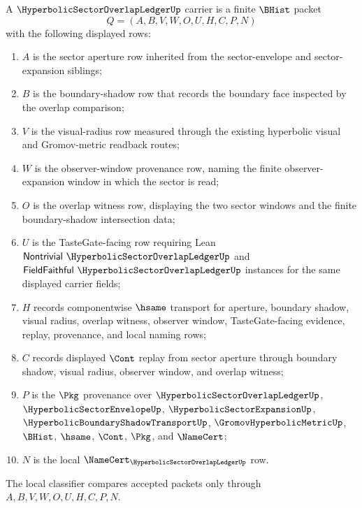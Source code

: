 \begin{definition}
\label{def:hyperbolic-sector-overlap-ledger-carrier}
A $\HyperbolicSectorOverlapLedgerUp$ carrier is a finite $\BHist$ packet
$$
Q=(A,B,V,W,O,U,H,C,P,N)
$$
with the following displayed rows:
\begin{enumerate}
\item $A$ is the sector aperture row inherited from the sector-envelope and sector-expansion siblings;
\item $B$ is the boundary-shadow row that records the boundary face inspected by the overlap comparison;
\item $V$ is the visual-radius row measured through the existing hyperbolic visual and Gromov-metric readback routes;
\item $W$ is the observer-window provenance row, naming the finite observer-expansion window in which the sector is read;
\item $O$ is the overlap witness row, displaying the two sector windows and the finite boundary-shadow intersection data;
\item $U$ is the TasteGate-facing row requiring Lean $\mathsf{Nontrivial}\ \HyperbolicSectorOverlapLedgerUp$ and $\mathsf{FieldFaithful}\ \HyperbolicSectorOverlapLedgerUp$ instances for the same displayed carrier fields;
\item $H$ records componentwise $\hsame$ transport for aperture, boundary shadow, visual radius, overlap witness, observer window, TasteGate-facing evidence, replay, provenance, and local naming rows;
\item $C$ records displayed $\Cont$ replay from sector aperture through boundary shadow, visual radius, observer window, and overlap witness;
\item $P$ is the $\Pkg$ provenance over $\HyperbolicSectorOverlapLedgerUp$, $\HyperbolicSectorEnvelopeUp$, $\HyperbolicSectorExpansionUp$, $\HyperbolicBoundaryShadowTransportUp$, $\GromovHyperbolicMetricUp$, $\BHist$, $\hsame$, $\Cont$, $\Pkg$, and $\NameCert$;
\item $N$ is the local $\NameCert_{\HyperbolicSectorOverlapLedgerUp}$ row.
\end{enumerate}
The local classifier compares accepted packets only through $A,B,V,W,O,U,H,C,P,N$.
\end{definition}

